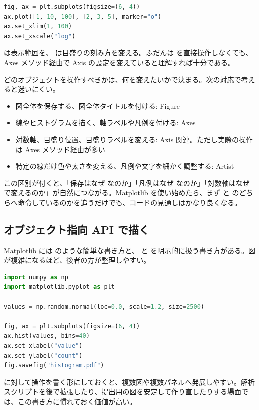 \begin{lstlisting}[language=Python]
fig, ax = plt.subplots(figsize=(6, 4))
ax.plot([1, 10, 100], [2, 3, 5], marker="o")
ax.set_xlim(1, 100)
ax.set_xscale("log")
\end{lstlisting}

 は表示範囲を、 は目盛りの刻み方を変える。ふだんは  を直接操作しなくても、Axes メソッド経由で Axis の設定を変えていると理解すれば十分である。

どのオブジェクトを操作すべきかは、何を変えたいかで決まる。次の対応で考えると迷いにくい。

\begin{itemize}
\item 図全体を保存する、図全体タイトルを付ける: Figure
\item 線やヒストグラムを描く、軸ラベルや凡例を付ける: Axes
\item 対数軸、目盛り位置、目盛りラベルを変える: Axis 関連。ただし実際の操作は Axes メソッド経由が多い
\item 特定の線だけ色や太さを変える、凡例や文字を細かく調整する: Artist
\end{itemize}

この区別が付くと、「保存はなぜ  なのか」「凡例はなぜ  なのか」「対数軸はなぜ  で変えるのか」が自然につながる。Matplotlib を使い始めたら、まず  と  のどちらへ命令しているのかを追うだけでも、コードの見通しはかなり良くなる。

\subsection{オブジェクト指向 API で描く}

Matplotlib には  のような簡単な書き方と、 と  を明示的に扱う書き方がある。図が複雑になるほど、後者の方が整理しやすい。

\begin{lstlisting}[language=Python]
import numpy as np
import matplotlib.pyplot as plt

values = np.random.normal(loc=0.0, scale=1.2, size=2500)

fig, ax = plt.subplots(figsize=(6, 4))
ax.hist(values, bins=40)
ax.set_xlabel("value")
ax.set_ylabel("count")
fig.savefig("histogram.pdf")
\end{lstlisting}

 に対して操作を書く形にしておくと、複数図や複数パネルへ発展しやすい。解析スクリプトを後で拡張したり、提出用の図を安定して作り直したりする場面では、この書き方に慣れておく価値が高い。

